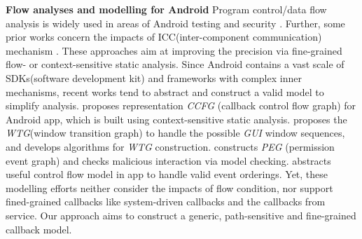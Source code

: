 \textbf{Flow analyses and modelling for Android}
Program control/data flow analysis is widely used in areas of Android testing\cite{new2012concolic}\cite{new2013automated} and security \cite{new2014flowdroid}\cite{new2015DroidSafe}. Further, some prior works concern the impacts of ICC(inter-component communication) mechanism \cite{new2013epicc}\cite{new2015iccta}. These approaches aim at improving the precision via fine-grained flow- or context-sensitive static analysis.
Since Android contains a vast scale of SDKs(software development kit) and frameworks with complex inner mechanisms, recent works tend to abstract and construct a valid model to simplify analysis. \cite{new2015static} proposes representation \textit{CCFG} (callback control flow graph) for Android app, which is built using context-sensitive static analysis. \cite{new2015window} proposes the \textit{WTG}(window transition graph) to handle the possible \textit{GUI} window sequences, and develops algorithms for \textit{WTG} construction. \cite{new2013contextual} constructs \textit{PEG} (permission event graph) and checks malicious interaction via model checking. \cite{new2015jumping} abstracts useful control flow model in app to handle valid event orderings. Yet, these modelling efforts neither consider the impacts of flow condition, nor support fined-grained callbacks like system-driven callbacks and the callbacks from service. Our approach aims to construct a generic, path-sensitive and fine-grained callback model. 






